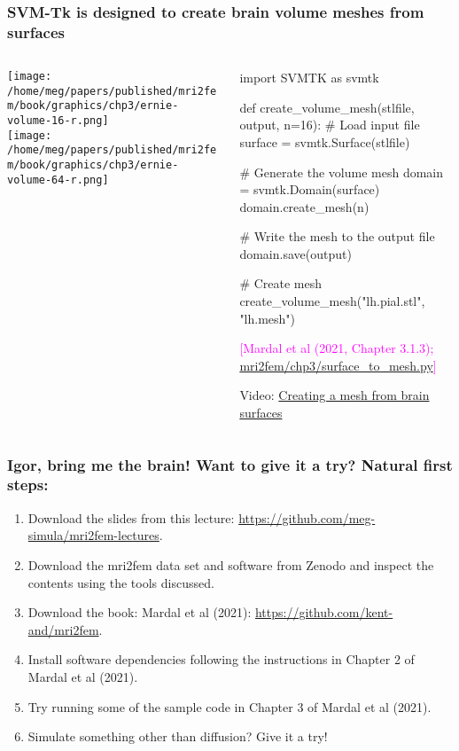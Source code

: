 \documentclass[10pt, mathserif, aspectratio=169, t, usenames, dvipsnames]{beamer}
\newcommand{\referself}[1]{\begin{flushright}{\tiny \textcolor{Magenta}{[#1]}}\end{flushright}}
\begin{document}
\begin{frame}[fragile]
\frametitle{SVM-Tk is designed to create brain volume meshes from surfaces}
\begin{columns}[T]
\begin{column}{0.34\textwidth}
  {\centering
  \texttt{[image: /home/meg/papers/published/mri2fem/book/graphics/chp3/ernie-volume-16-r.png]} \\
  \texttt{[image: /home/meg/papers/published/mri2fem/book/graphics/chp3/ernie-volume-64-r.png]}
  }
\end{column}
\begin{column}{0.65\textwidth}
  \begin{python}
import SVMTK as svmtk

def create_volume_mesh(stlfile, output, n=16):
    # Load input file
    surface = svmtk.Surface(stlfile)
    
    # Generate the volume mesh
    domain = svmtk.Domain(surface)
    domain.create_mesh(n)

    # Write the mesh to the output file
    domain.save(output)

# Create mesh    
create_volume_mesh("lh.pial.stl", "lh.mesh")
  \end{python}
  \referself{Mardal et al (2021, Chapter 3.1.3); \href{https://github.com/kent-and/mri2fem/blob/master/mri2fem/mri2fem/chp3/surface_to_mesh.py}{mri2fem/chp3/surface\_to\_mesh.py}}

  \medskip
  
\alert{Video: \href{https://youtu.be/tHGmzPqiYhQ}{Creating a mesh from brain surfaces}}

\end{column}

\end{columns}


\end{frame}



\begin{frame}
\frametitle{Igor, bring me the brain! Want to give it a try? Natural first steps:}
\begin{enumerate}
\item
  Download the slides from this lecture:  \href{https://github.com/meg-simula/mri2fem-lectures}{https://github.com/meg-simula/mri2fem-lectures}.
\item
  Download the mri2fem data set and software from Zenodo and inspect
  the contents using the tools discussed.
\item
  Download the book: Mardal et al (2021): \href{https://github.com/kent-and/mri2fem}{https://github.com/kent-and/mri2fem}.
\item
  Install software dependencies following the instructions in Chapter
  2 of Mardal et al (2021).
\item
  Try running some of the sample code in Chapter 3 of Mardal et al
  (2021).
\item
  Simulate something other than diffusion? Give it a try!
\end{enumerate}
\end{frame}
\end{document}
